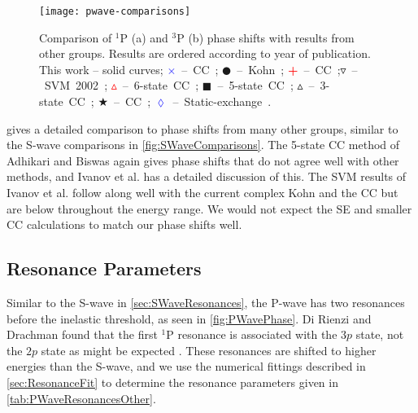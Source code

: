 \documentclass[Dissertation.tex]{subfiles}
\begin{document}
\begin{figure}[H]
	\centering
	\texttt{[image: pwave-comparisons]}
	\caption[Comparison of P-wave phase shifts]{Comparison of $^1$P (a) and $^3$P (b) phase shifts with results from other groups. Results are ordered according to year of publication. This work -- solid curves; \mbox{\textcolor{blue}{$\times$} -- CC \cite{Walters2004};} \mbox{$\CIRCLE$ -- Kohn \cite{VanReeth2003};} \mbox{\textcolor{red}{\textbf{+}} -- CC \cite{Blackwood2002};}\mbox{$\triangledown$ -- SVM 2002 \cite{Ivanov2002};} \mbox{\textcolor{red}{$\vartriangle$} -- 6-state CC \cite{Sinha2000};} \mbox{$\blacksquare$ -- 5-state CC \cite{Adhikari1999};} \mbox{$\vartriangle$ -- 3-state CC \cite{Sinha1997};} \mbox{\textcolor[RGB]{0,127,0}{$\bigstar$} -- CC \cite{Ray1997};} \mbox{\textcolor{blue}{$\lozenge$} -- Static-exchange \cite{Hara1975}.}}
	\label{fig:PWaveComparisons}
\end{figure}

 gives a detailed comparison to phase shifts from many other groups, similar to the S-wave comparisons in \cref{fig:SWaveComparisons}. The 5-state CC method of Adhikari and Biswas \cite{Adhikari1999} again gives phase shifts that do not agree well with other methods, and Ivanov et al. \cite{Ivanov2002} has a detailed discussion of this. The SVM results of Ivanov et al. \cite{Ivanov2002} follow along well with the current complex Kohn and the CC \cite{Blackwood2002,Walters2004} but are below throughout the energy range. We would not expect the SE \cite{Hara1975,Ray1997} and smaller CC calculations \cite{Sinha1997} to match our phase shifts well.


\subsection{Resonance Parameters}
\label{sec:PWaveResonances}

Similar to the S-wave in \cref{sec:SWaveResonances}, the P-wave has two 
resonances before the inelastic threshold, as seen in \cref{fig:PWavePhase}. 
Di Rienzi and Drachman found that the first $^1$P resonance is associated 
with the $3p$ state, not the $2p$ state as might be expected
\cite{DiRienzi2002b}. These resonances are shifted to higher energies than the
S-wave, and we use the numerical fittings described in \cref{sec:ResonanceFit}
to determine the resonance parameters given in \cref{tab:PWaveResonancesOther}.
\end{document}
